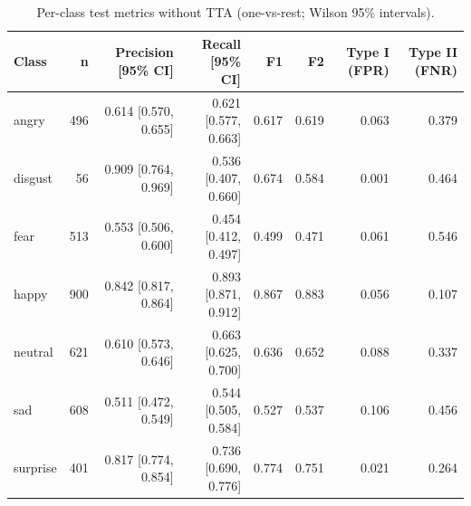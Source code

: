 \begin{table}[ht]
\centering
\small
\caption{Per-class test metrics without TTA (one-vs-rest; Wilson 95\% intervals).}
\label{tab:perclass-notta}
\begin{tabular}{lrrrrrrr}
\toprule
Class & n & Precision [95\% CI] & Recall [95\% CI] & F1 & F2 & Type I (FPR) & Type II (FNR) \\
\midrule
angry & 496 & 0.614 [0.570, 0.655] & 0.621 [0.577, 0.663] & 0.617 & 0.619 & 0.063 & 0.379 \\
disgust & 56 & 0.909 [0.764, 0.969] & 0.536 [0.407, 0.660] & 0.674 & 0.584 & 0.001 & 0.464 \\
fear & 513 & 0.553 [0.506, 0.600] & 0.454 [0.412, 0.497] & 0.499 & 0.471 & 0.061 & 0.546 \\
happy & 900 & 0.842 [0.817, 0.864] & 0.893 [0.871, 0.912] & 0.867 & 0.883 & 0.056 & 0.107 \\
neutral & 621 & 0.610 [0.573, 0.646] & 0.663 [0.625, 0.700] & 0.636 & 0.652 & 0.088 & 0.337 \\
sad & 608 & 0.511 [0.472, 0.549] & 0.544 [0.505, 0.584] & 0.527 & 0.537 & 0.106 & 0.456 \\
surprise & 401 & 0.817 [0.774, 0.854] & 0.736 [0.690, 0.776] & 0.774 & 0.751 & 0.021 & 0.264 \\
\bottomrule
\end{tabular}
\end{table}